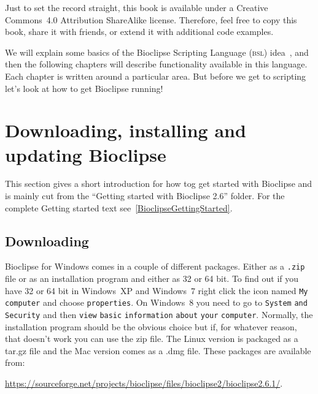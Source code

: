 \documentclass[a5paper, 10pt]{memoir}
\begin{document}
\begin{refsection}

Just to set the record straight, this book is available under a Creative
Commons~4.0 Attribution ShareAlike license. Therefore, feel free to copy this
book, share it with friends, or extend it with additional code examples.

We will explain some basics of the Bioclipse Scripting Language (\textsc{bsl})
idea~\cite{spjuth2009bioclipse}, and then the following chapters will
describe functionality available in this language. Each chapter is
written around a particular area. But before we get to scripting let's look at
how to get Bioclipse running!

\section{Downloading, installing and updating Bioclipse}
This section gives a short introduction for how tog get started with Bioclipse
and is mainly cut from the ``Getting started with Bioclipse 2.6'' folder. For
the complete Getting started text see~\ref{BioclipseGettingStarted}.

\subsection{Downloading}
Bioclipse for Windows comes in a couple of different packages. Either as a
\texttt{.zip} file or as an installation program and either as 32 or 64 bit. To
find out if you have 32 or 64 bit in Windows~XP  and Windows~7 right click the
icon named \texttt{My} \texttt{computer} and choose \texttt{properties}. On
Windows~8 you need to go to \texttt{System} \texttt{and} \texttt{Security} and
then \texttt{view} \texttt{basic} \texttt{information} \texttt{about}
\texttt{your} \texttt{computer}.  Normally, the installation program should be
the obvious choice but if, for whatever reason, that doesn't work you can use
the zip file. The Linux version is packaged as a tar.gz file and the Mac
version comes as a .dmg file. These packages are available from:

\baselineskip
{\footnotesize \noindent \url{https://sourceforge.net/projects/bioclipse/files/bioclipse2/bioclipse2.6.1/}.}

\begin{center}
\end{center}


\end{refsection}
\end{document}
